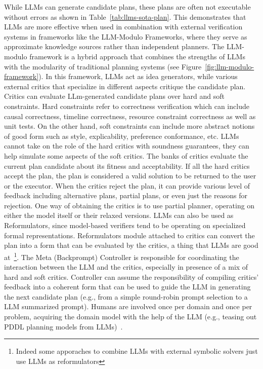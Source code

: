 While LLMs can generate candidate plans, these plans are often not executable without errors as shown in Table~\ref{tab:llms-sota-plan}.
This demonstrates that LLMs are more effective when used in combination with external verification systems in frameworks like the LLM-Modulo Frameworks, where they serve as approximate knowledge sources rather than independent planners.
The LLM-modulo framework is a hybrid approach that combines the strengths of LLMs with the modularity of traditional planning systems (see Figure~\ref{fig:llm-modulo-framework}).
In this framework, LLMs act as idea generators, while various external critics that specialize in different aspects critique the candidate plan.
Critics can evaluate LLm-generated candidate plans over hard and soft constraints.
Hard constraints refer to correctness verification which can include causal correctness, timeline correctness, resource constraint correctness as well as unit tests.
On the other hand, soft constraints can include more abstract notions of good form such as style, explicability, preference conformance, etc.
LLMs cannot take on the role of the hard critics with soundness guarantees, they can help simulate some aspects of the soft critics.
The banks of critics evaluate the current plan candidate about its fitness and acceptability.
If all the hard critics accept the plan, the plan is considered a valid solution to be returned to the user or the executor.
When the critics reject the plan, it can provide various level of feedback including alternative plans, partial plans, or even just the reasons for rejection.
One way of obtaining the critics is to use partial planner, operating on either the model itself or their relaxed versions\cite{bryce2007tutorial}.
LLMs can also be used as Reformulators, since model-based verifiers tend to be operating on specialized formal representations.
Reformulators module attached to critics can convert the plan into a form that can be evaluated by the critics, a thing that LLMs are good at~\cite{olmo2021gpt3toplan}\footnote{Indeed some apporaches to combine LLMs with external symbolic solvers just use LLMs as reformulators}.
The Meta (Backprompt) Controller is responsible for coordinating the interaction between the LLM and the critics, especially in presence of a mix of hard and soft critics.
Controller can assume the responsibility of compiling critics' feedback into a coherent form that can be used to guide the LLM in generating the next candidate plan (e.g., from a simple round-robin prompt selection to a LLM summarized prompt).
Humans are involved once per domain and once per problem, acquiring the domain model with the help of the LLM (e.g., teasing out PDDL planning models from LLMs)~\cite{guan2023leveraging}.
